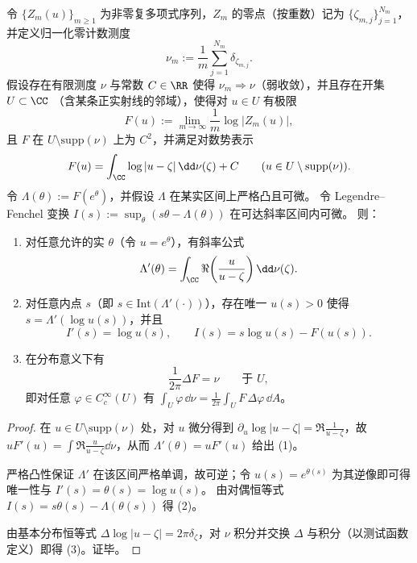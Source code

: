 \begin{theorem}\label{thm:conclusion-leyang-zero-measure-stokes-inversion-ldp}
令 \(\{Z_m(u)\}_{m\ge 1}\) 为非零复多项式序列，\(Z_m\) 的零点（按重数）记为 \(\{\zeta_{m,j}\}_{j=1}^{N_m}\)，并定义归一化零计数测度
\[
\nu_m:=\frac{1}{m}\sum_{j=1}^{N_m}\delta_{\zeta_{m,j}}.
\]
假设存在有限测度 \(\nu\) 与常数 \(C\in\RR\) 使得 \(\nu_m\Rightarrow \nu\)（弱收敛），并且存在开集
\(U\subset\CC\)
（含某条正实射线的邻域），使得对 \(u\in U\) 有极限
\[
F(u):=\lim_{m\to\infty}\frac{1}{m}\log|Z_m(u)|,
\]
且 \(F\) 在 \(U\setminus \mathrm{supp}(\nu)\) 上为 \(C^2\)，并满足对数势表示
\[
F(u)=\int_{\CC}\log|u-\zeta|\,\dd\nu(\zeta)+C
\qquad (u\in U\setminus \mathrm{supp}(\nu)).
\]
令 \(\Lambda(\theta):=F(e^\theta)\)，并假设 \(\Lambda\) 在某实区间上严格凸且可微。
令 Legendre--Fenchel 变换
\(
I(s):=\sup_{\theta}(s\theta-\Lambda(\theta))
\)
在可达斜率区间内可微。
则：
\begin{enumerate}
  \item 对任意允许的实 \(\theta\)（令 \(u=e^\theta\)），有斜率公式
  \[
  \Lambda'(\theta)=\int_{\CC}\Re\!\left(\frac{u}{u-\zeta}\right)\dd\nu(\zeta).
  \]
  \item 对任意内点 \(s\)（即 \(s\in\mathrm{Int}(\Lambda'(\cdot))\)），存在唯一 \(u(s)>0\) 使得
  \(s=\Lambda'(\log u(s))\)，并且
  \[
  I'(s)=\log u(s),
  \qquad
  I(s)=s\log u(s)-F(u(s)).
  \]
  \item 在分布意义下有
  \[
  \frac{1}{2\pi}\Delta F=\nu\qquad\text{于 }U,
  \]
  即对任意 \(\varphi\in C_c^\infty(U)\) 有
  \(
  \int_U \varphi\,\dd\nu=\frac{1}{2\pi}\int_U F\,\Delta\varphi\,\dd A
  \)。
\end{enumerate}
\end{theorem}
\begin{proof}
在 \(u\in U\setminus\mathrm{supp}(\nu)\) 处，对 \(u\) 微分得到
\(
\partial_u\log|u-\zeta|=\Re\frac{1}{u-\zeta}
\)，故
\(
uF'(u)=\int \Re\frac{u}{u-\zeta}\dd\nu
\)，从而 \(\Lambda'(\theta)=uF'(u)\) 给出 (1)。
\par
严格凸性保证 \(\Lambda'\) 在该区间严格单调，故可逆；令 \(u(s)=e^{\theta(s)}\) 为其逆像即可得唯一性与 \(I'(s)=\theta(s)=\log u(s)\)。
由对偶恒等式 \(I(s)=s\theta(s)-\Lambda(\theta(s))\) 得 (2)。
\par
由基本分布恒等式 \(\Delta\log|u-\zeta|=2\pi\delta_\zeta\)，对 \(\nu\) 积分并交换 \(\Delta\) 与积分（以测试函数定义）即得 (3)。证毕。
\end{proof}

